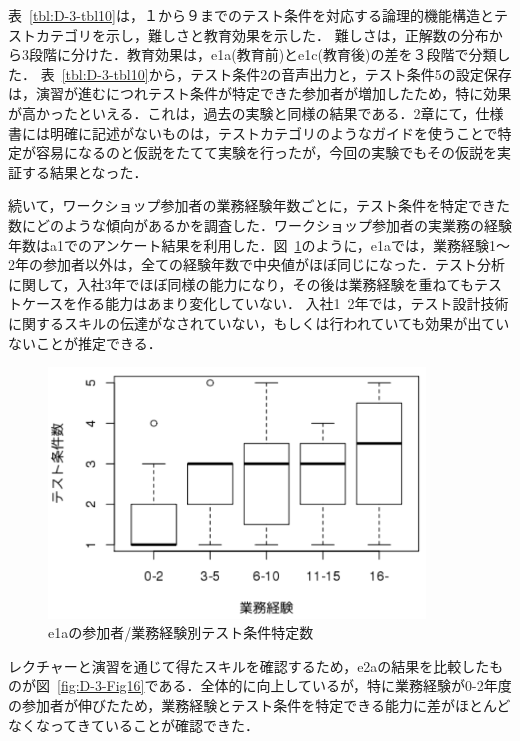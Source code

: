 表~\ref{tbl:D-3-tbl10}は，１から９までのテスト条件を対応する論理的機能構造とテストカテゴリを示し，難しさと教育効果を示した．
難しさは，正解数の分布から3段階に分けた．教育効果は，e1a(教育前)とe1c(教育後)の差を３段階で分類した．
表~\ref{tbl:D-3-tbl10}から，テスト条件2の音声出力と，テスト条件5の設定保存は，演習が進むにつれテスト条件が特定できた参加者が増加したため，特に効果が高かったといえる．これは，過去の実験と同様の結果である．2章にて，仕様書には明確に記述がないものは，テストカテゴリのようなガイドを使うことで特定が容易になるのと仮説をたてて実験を行ったが，今回の実験でもその仮説を実証する結果となった．

続いて，ワークショップ参加者の業務経験年数ごとに，テスト条件を特定できた数にどのような傾向があるかを調査した．ワークショップ参加者の実業務の経験年数はa1でのアンケート結果を利用した．図~\ref{fig:D-3-Fig15}のように，e1aでは，業務経験1～2年の参加者以外は，全ての経験年数で中央値がほぼ同じになった．テスト分析に関して，入社3年でほぼ同様の能力になり，その後は業務経験を重ねてもテストケースを作る能力はあまり変化していない．
入社1~2年では，テスト設計技術に関するスキルの伝達がなされていない，もしくは行われていても効果が出ていないことが推定できる．
\begin{figure}[htbp]
  \begin{center}
  \includegraphics[width=10cm]{./image/D-3-Fig15.png}
  \caption{e1aの参加者/業務経験別テスト条件特定数}
  \label{fig:D-3-Fig15}
  \end{center}
\end{figure}

レクチャーと演習を通じて得たスキルを確認するため，e2aの結果を比較したものが図~\ref{fig:D-3-Fig16}である．全体的に向上しているが，特に業務経験が0-2年度の参加者が伸びたため，業務経験とテスト条件を特定できる能力に差がほとんどなくなってきていることが確認できた．

